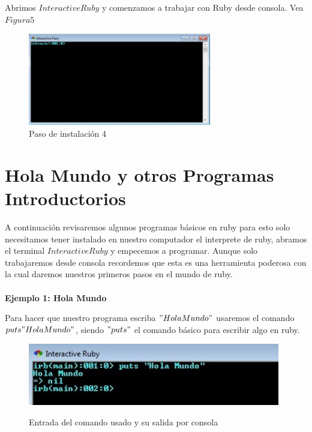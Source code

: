 \documentclass[11pt]{article} %
\begin{document}
\begin{itemize}
Abrimos  $Interactive Ruby$ y comenzamos a trabajar con Ruby desde consola. Vea $ Figura 5$
\begin{figure}[h]
\centering
 \includegraphics[width=8cm]{./imagenes/PasoInst4.jpg}
\caption{Paso de instalación 4}\label{Fig:Paso4}
\end{figure}


\end{itemize}


\section{\fontsize{16}{0} \bf Hola Mundo y otros Programas Introductorios}

A continuación revisaremos algunos programas básicos en ruby para esto solo necesitamos tener instalado en nuestro computador el interprete de ruby, abramos el terminal $ Interactive Ruby$  y empecemos a  programar. Aunque  solo trabajaremos desde consola  recordemos que esta es una herramienta poderosa con la cual daremos nuestros primeros pasos en el mundo de ruby.\\ \\


 {\fontsize{14}{0} \bf Ejemplo 1: Hola Mundo\\}

Para hacer que nuestro programa escriba $"Hola Mundo"$ usaremos el comando $puts  "Hola Mundo"$, siendo  $"puts"$ el comando básico para escribir algo en ruby. \\

\begin{figure}[h]
\centering
 \includegraphics[width=11cm]{./imagenes/Hola.jpg}\\
\caption{Entrada del comando usado y su salida por consola }\label{Fig:Hola}
\end{figure}
\end{document}
